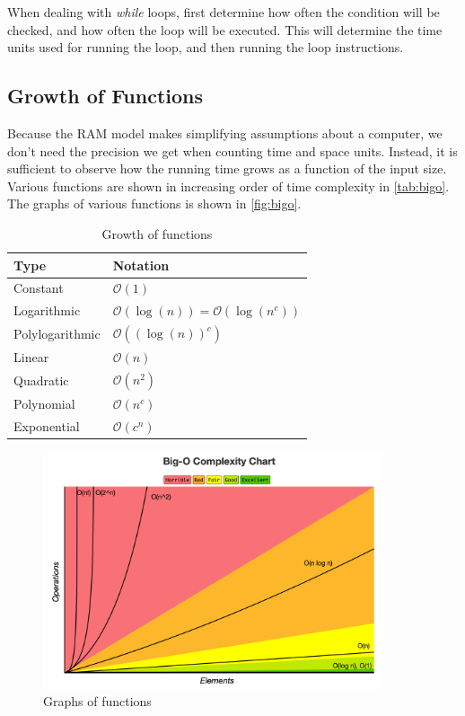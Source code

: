 When dealing with \emph{while} loops, first determine how often the condition will be checked, and how often the loop will be executed. This will determine the time units used for running the loop, and then running the loop instructions.

\subsection{Growth of Functions}

Because the RAM model makes simplifying assumptions about a computer, we don't need the precision we get when counting time and space units. Instead, it is sufficient to observe how the running time grows as a function of the input size. Various functions are shown in increasing order of time complexity in \autoref{tab:bigo}. The graphs of various functions is shown in \autoref{fig:bigo}.

\begin{table}[ht]
    \centering
    \begin{tabular}{ll}
        \toprule
        \textbf{Type}   & \textbf{Notation}                                \\ \midrule
        Constant        & \( \mathcal{O}(1) \)                             \\
        Logarithmic     & \(\mathcal{O}(\log(n)) =\mathcal{O}(\log(n^c))\) \\
        Polylogarithmic & \(\mathcal{O}((\log(n))^c) \)                    \\
        Linear          & \(\mathcal{O}(n) \)                              \\
        Quadratic       & \(\mathcal{O}(n^2) \)                            \\
        Polynomial      & \(\mathcal{O}(n^c) \)                            \\
        Exponential     & \(\mathcal{O}(c^n) \)                            \\
        \bottomrule
    \end{tabular}
    \caption{Growth of functions}\label{tab:bigo}
\end{table}

\begin{figure}[H]
    \centering
    \includegraphics[width=10cm]{bigo.png}
    \caption{Graphs of functions} \label{fig:bigo}
\end{figure}

